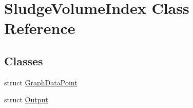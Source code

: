 \hypertarget{class_sludge_volume_index}{}\section{Sludge\+Volume\+Index Class Reference}
\label{class_sludge_volume_index}
\subsection*{Classes}
\begin{DoxyCompactItemize}
\item 
struct \hyperlink{struct_sludge_volume_index_1_1_graph_data_point}{Graph\+Data\+Point}
\item 
struct \hyperlink{struct_sludge_volume_index_1_1_output}{Output}
\end{DoxyCompactItemize}
